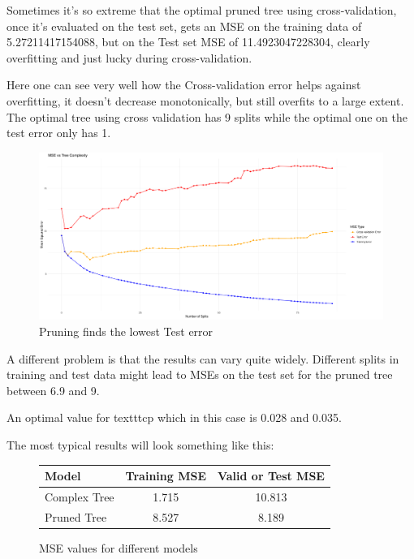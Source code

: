 \documentclass[12pt]{article}
\begin{document}
Sometimes it's so extreme that the optimal pruned tree using cross-validation, once it's evaluated on the test set, gets an MSE on the training data of 5.27211417154088, but on the Test set MSE of 11.4923047228304, clearly overfitting and just lucky during cross-validation.

Here one can see very well how the Cross-validation error helps against overfitting, it doesn't decrease monotonically, but still overfits to a large extent. The optimal tree using cross validation has 9 splits while the optimal one on the test error only has 1.

\begin{figure}
    \centering
    \includegraphics[scale=0.30]{triple_pruning_plot.pdf}
    \caption{Pruning finds the lowest Test error}
\end{figure}

A different problem is that the results can vary quite widely. Different splits in training and test data might lead to MSEs on the test set for the pruned tree between 6.9 and 9.

An optimal value for texttt{cp} which in this case is 0.028 and 0.035.


The most typical results will look something like this:

\begin{figure}
    \centering
    \begin{tabular}{| l | c | c |}
        \hline
        Model        & Training MSE & Valid or Test MSE \\
        \hline
        Complex Tree & 1.715        & 10.813            \\
        Pruned Tree  & 8.527        & 8.189             \\
        \hline
    \end{tabular}
    \caption{MSE values for different models}
\end{figure}
\end{document}
